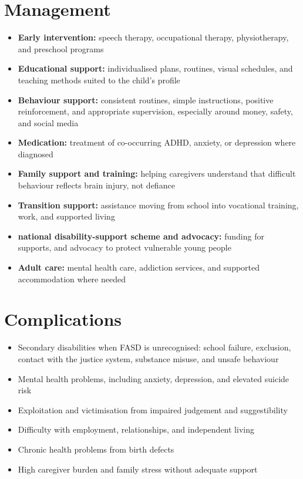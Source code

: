 \section*{Management}
\begin{itemize}
    \item \textbf{Early intervention:} speech therapy, occupational therapy, physiotherapy, and preschool programs
    \item \textbf{Educational support:} individualised plans, routines, visual schedules, and teaching methods suited to the child's profile
    \item \textbf{Behaviour support:} consistent routines, simple instructions, positive reinforcement, and appropriate supervision, especially around money, safety, and social media
    \item \textbf{Medication:} treatment of co-occurring ADHD, anxiety, or depression where diagnosed
    \item \textbf{Family support and training:} helping caregivers understand that difficult behaviour reflects brain injury, not defiance
    \item \textbf{Transition support:} assistance moving from school into vocational training, work, and supported living
    \item \textbf{national disability-support scheme and advocacy:} funding for supports, and advocacy to protect vulnerable young people
    \item \textbf{Adult care:} mental health care, addiction services, and supported accommodation where needed
\end{itemize}

\section*{Complications}
\begin{itemize}
    \item Secondary disabilities when FASD is unrecognised: school failure, exclusion, contact with the justice system, substance misuse, and unsafe behaviour
    \item Mental health problems, including anxiety, depression, and elevated suicide risk
    \item Exploitation and victimisation from impaired judgement and suggestibility
    \item Difficulty with employment, relationships, and independent living
    \item Chronic health problems from birth defects
    \item High caregiver burden and family stress without adequate support
\end{itemize}

